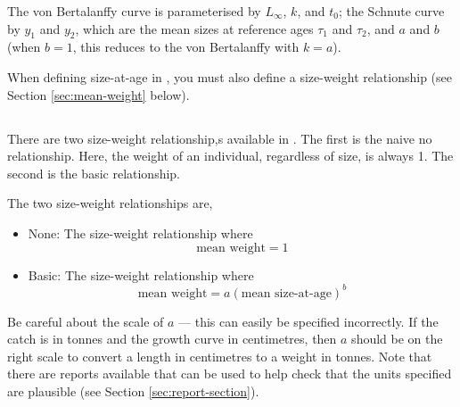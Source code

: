 The von Bertalanffy curve is parameterised by $L_\infty$, $k$, and $t_0$; the Schnute curve \citep{836} by $y_1$ and $y_2$, which are the mean sizes at reference ages $\tau_1$ and $\tau_2$, and $a$ and $b$ (when $b=1$, this reduces to the von Bertalanffy with $k=a$). 

When defining size-at-age in \SPM, you must also define a size-weight relationship (see Section \ref{sec:mean-weight} below).

\subsection{\label{sec:mean-weight}}

There are two size-weight relationship,s available in \SPM. The first is the naive no relationship. Here, the weight of an individual, regardless of size, is always 1. The second is the basic relationship. 

The two size-weight relationships are,

\begin{itemize}
  \item{None:} The size-weight relationship where  
  \begin{equation}
    \text{mean weight}=1
  \end{equation}
  \item{Basic:} The size-weight relationship where 
  \begin{equation}
    \text{mean weight}=a(\text{mean size-at-age})^b
  \end{equation}
\end{itemize}
  
Be careful about the scale of $a$ --- this can easily be specified incorrectly. If the catch is in tonnes and the growth curve in centimetres, then $a$ should be on the right scale to convert a length in centimetres to a weight in tonnes. Note that there are reports available that can be used to help check that the units specified are plausible (see Section \ref{sec:report-section}).


